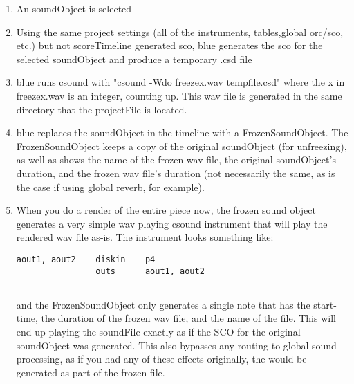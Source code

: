 \begin{enumerate}
\def\labelenumi{\arabic{enumi}.}
\item
  An soundObject is selected
\item
  Using the same project settings (all of the instruments, tables,global
  orc/sco, etc.) but not scoreTimeline generated sco, blue generates the
  sco for the selected soundObject and produce a temporary .csd file
\item
  blue runs csound with "csound -Wdo freezex.wav tempfile.csd" where the
  x in freezex.wav is an integer, counting up. This wav file is
  generated in the same directory that the projectFile is located.
\item
  blue replaces the soundObject in the timeline with a
  FrozenSoundObject. The FrozenSoundObject keeps a copy of the original
  soundObject (for unfreezing), as well as shows the name of the frozen
  wav file, the original soundObject's duration, and the frozen wav
  file's duration (not necessarily the same, as is the case if using
  global reverb, for example).
\item
  When you do a render of the entire piece now, the frozen sound object
  generates a very simple wav playing csound instrument that will play
  the rendered wav file as-is. The instrument looks something like:

\begin{verbatim}
aout1, aout2    diskin    p4         
                outs      aout1, aout2 
          
\end{verbatim}

  and the FrozenSoundObject only generates a single note that has the
  start-time, the duration of the frozen wav file, and the name of the
  file. This will end up playing the soundFile exactly as if the SCO for
  the original soundObject was generated. This also bypasses any routing
  to global sound processing, as if you had any of these effects
  originally, the would be generated as part of the frozen file.
\end{enumerate}

